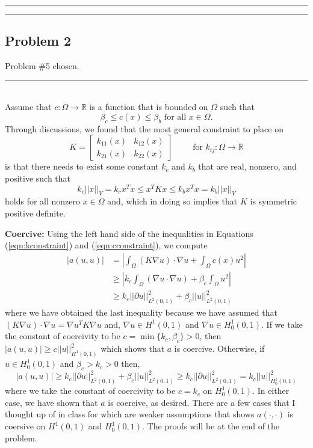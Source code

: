 \documentclass[12pt]{amsart}
\newcommand{\R}{\mathbb{R}}
\begin{document}
\medskip
\hrule
\hrule
\medskip
\subsection*{Problem 2}
Problem \#5 chosen.
\\
\medskip
\hrule
\medskip
%
\\

Assume that $c:\Omega\to\mathbb R$ is a function that is bounded on $\Omega$ such that 
\begin{equation}\label{eqn:cconstraint}
	\beta_c \leq c(x) \leq \beta_b \text{ for all }x\in\Omega.
\end{equation}
Through discussions, we found that the most general constraint to place on 
	\begin{equation}\label{eqn:k}
		K = \begin{bmatrix}
			k_{11}(x) & k_{12}(x)\\
			k_{21}(x) & k_{22}(x)
		\end{bmatrix}
	\quad\quad \text{ for } k_{ij}:\Omega \to \R
	\end{equation}
is that there needs to exist some constant $k_c$ and $k_b$ that are real, nonzero, and positive such that 
	\begin{equation}\label{eqn:kconstraint}
		k_c || x ||_V = k_c x^Tx \leq x^T K x \leq k_b x^T x = k_b || x ||_V
	\end{equation}
holds for all nonzero $x\in\Omega$ and, which in doing so implies that $K$ is symmetric positive definite.

\noindent\textbf{Coercive:} Using the left hand side of the inequalities in Equations (\ref{eqn:kconstraint}) and (\ref{eqn:cconstraint}), we compute
\begin{align*}
	|a(u,u)| & = \left| \int_\Omega (K\nabla u)\cdot \nabla u + \int_\Omega c(x) u^2 \right|\\
		   & \geq \left| k_c \int_\Omega \left(\nabla u\cdot\nabla u\right) + \beta_c \int_\Omega u^2 \right|\\
		    & \geq k_c ||\partial u||_{L^2(0,1)}^2 + \beta_c || u||_{L^2(0,1)}^2
\end{align*}
where we have obtained the last inequality because we have assumed that $(K\nabla u)\cdot \nabla u = \nabla u^T K \nabla u$ and, $\nabla u\in H^1(0,1)$ and $\nabla u\in H_0^1(0,1)$. If we take the constant of coercivity to be $c = \min\{ k_c, \beta_c\} > 0$, then $|a(u,u)| \geq c || u ||_{H^1(0,1)}^2$ which shows that $a$ is coercive. Otherwise, if $u\in H_0^1(0,1)$ and $\beta_c > k_c > 0$ then,  
	\[|a(u,u)| \geq k_c ||\partial u||_{L^2(0,1)}^2 + \beta_c || u||_{L^2(0,1)}^2 \geq k_c ||\partial u||_{L^2(0,1)}^2 = k_c ||u||_{H_0^1(0,1)}^2\]
where we take the constant of coercivity to be $c = k_c$ on $H_0^1(0,1)$. In either case, we have shown that $a$ is coercive, as desired. There are a few cases that I thought up of in class for which are weaker assumptions that shows $a(\cdot,\cdot)$ is coersive on $H^1(0,1)$ and $H_0^1(0,1)$. The proofs will be at the end of the problem. \\
 
\end{document}
